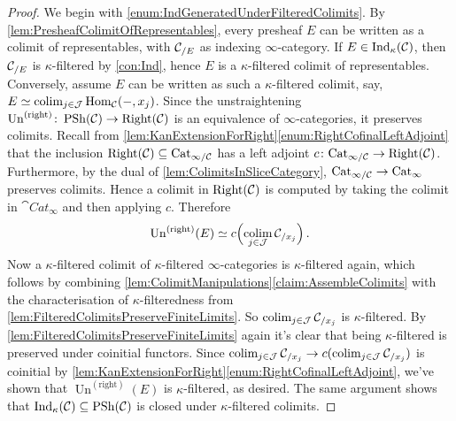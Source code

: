 \begin{proof}
	We begin with \cref{enum:IndGeneratedUnderFilteredColimits}. By \cref{lem:PresheafColimitOfRepresentables}, every presheaf $E$ can be written as a colimit of representables, with $\mathcal{C}_{/E}$ as indexing $\infty$-category. If $E\in\mathrm{Ind}_\kappa(\mathcal{C})$, then $\mathcal{C}_{/E}$ is $\kappa$-filtered by \cref{con:Ind}, hence $E$ is a $\kappa$-filtered colimit of representables. Conversely, assume $E$ can be written as such a $\kappa$-filtered colimit, say, $E\simeq\operatorname*{colim}_{j\in\mathcal{J}}\operatorname{Hom}_{\mathcal{C}}(-,x_j)$. Since the unstraightening $\operatorname{Un}^{(\mathrm{right})}\colon \operatorname{PSh}(\mathcal{C})\rightarrow\mathrm{Right}(\mathcal{C})$ is an equivalence of $\infty$-categories, it preserves colimits. Recall from \cref{lem:KanExtensionForRight}\cref{enum:RightCofinalLeftAdjoint} that the inclusion $\mathrm{Right}(\mathcal{C})\subseteq\mathrm{Cat}_{\infty/\mathcal{C}}$ has a left adjoint $c\colon \mathrm{Cat}_{\infty/\mathcal{C}}\rightarrow\mathrm{Right}(\mathcal{C})$. Furthermore, by the dual of \cref{lem:ColimitsInSliceCategory}, $\mathrm{Cat}_{\infty/\mathcal{C}}\rightarrow\operatorname{Cat}_\infty$ preserves colimits. Hence a colimit in $\mathrm{Right}(\mathcal{C})$ is computed by taking the colimit in $\cat{Cat}_\infty$ and then applying $c$. Therefore
	\begin{equation*}
		\operatorname{Un}^{(\mathrm{right})}(E)\simeq c\Bigl(\operatorname*{colim}_{j\in\mathcal{J}}\mathcal{C}_{/x_j}\Bigr)\,.
	\end{equation*}
	Now a $\kappa$-filtered colimit of $\kappa$-filtered $\infty$-categories is $\kappa$-filtered again, which follows by combining \cref{lem:ColimitManipulations}\cref{claim:AssembleColimits} with the characterisation of $\kappa$-filteredness from \cref{lem:FilteredColimitsPreserveFiniteLimits}. So $\operatorname*{colim}_{j\in\mathcal{J}}\mathcal{C}_{/x_j}$ is $\kappa$-filtered. By \cref{lem:FilteredColimitsPreserveFiniteLimits} again it's clear that being $\kappa$-filtered is preserved under coinitial functors. Since $\operatorname*{colim}_{j\in\mathcal{J}}\mathcal{C}_{/x_j}\rightarrow c(\operatorname*{colim}_{j\in\mathcal{J}}\mathcal{C}_{/x_j})$ is coinitial by \cref{lem:KanExtensionForRight}\cref{enum:RightCofinalLeftAdjoint}, we've shown that $\operatorname{Un}^{(\mathrm{right})}(E)$ is $\kappa$-filtered, as desired. The same argument shows that $\mathrm{Ind}_\kappa(\mathcal{C})\subseteq \operatorname{PSh}(\mathcal{C})$ is closed under $\kappa$-filtered colimits.
	

\end{proof}
